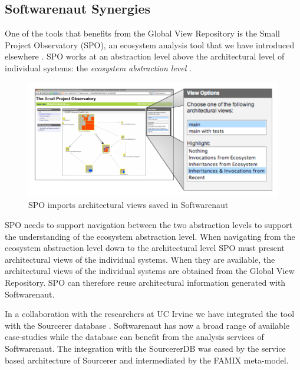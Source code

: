 \documentclass[preprint,12pt]{elsarticle}
\begin{document}
\subsection {Softwarenaut Synergies}

One of the tools that benefits from the Global View Repository is the Small Project Observatory (SPO), an ecosystem analysis tool that we have introduced elsewhere \cite{lungu-est}. SPO works at an abstraction level above the architectural level of individual systems: the {\em ecosystem abstraction level} \cite{lungu-thesis}. 

\begin{figure}[ht]
\begin{center}
\includegraphics[width=\linewidth]{SpoArchitectural}
\caption{SPO imports architectural views saved in Softwarenaut}
\label{}
\end{center}
\end{figure}

SPO needs to support navigation between the two abstraction levels to support the understanding of  the ecosystem abstraction level. When navigating from the ecosystem abstraction level down to the architectural level SPO must present architectural views of the individual systems. When they are available, the architectural views of the individual systems are obtained from the Global View Repository. SPO can therefore reuse architectural information generated with Softwarenaut.

In a collaboration with the researchers at UC Irvine we have integrated the tool with the Sourcerer database \cite{linstead-sourcerer}. Softwarenaut has now a broad range of available case-studies while the database can benefit from the analysis services of Softwarenaut. The integration with the SourcererDB was eased by the service based architecture of Sourcerer and intermediated by the FAMIX meta-model. %
\end{document}
